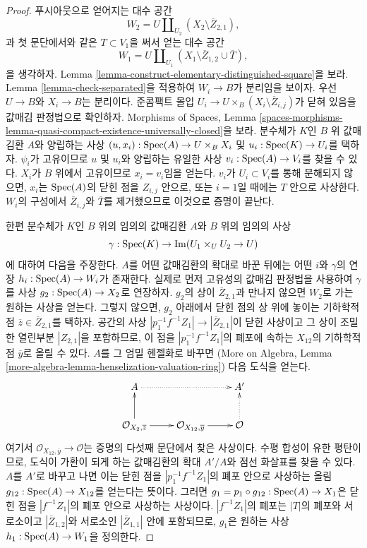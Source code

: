 \begin{proof}
\medskip\noindent
푸시아웃으로 얻어지는 대수 공간
$$
W_2 = U \coprod\nolimits_{U_2} (X_2 \setminus \overline{Z}_{2, 1}),
$$
과 첫 문단에서와 같은 $T \subset V_1$을 써서 얻는 대수 공간
$$
W_1 = U \coprod\nolimits_{U_1}
(X_1 \setminus \overline{Z}_{1, 2} \cup \overline{T}),
$$
을 생각하자. Lemma
\ref{lemma-construct-elementary-distinguished-square}을 보라.
Lemma \ref{lemma-check-separated}을 적용하여 $W_i \to B$가 분리임을
보이자. 우선 $U \to B$와 $X_i \to B$는 분리이다.
준콤팩트 몰입
$U_i \to U \times_B (X_i \setminus \overline{Z}_{i, j})$가 닫혀
있음을 값매김 판정법으로 확인하자. Morphisms of Spaces, Lemma
\ref{spaces-morphisms-lemma-quasi-compact-existence-universally-closed}을
보라. 분수체가 $K$인 $B$ 위 값매김환 $A$와 양립하는 사상
$(u, x_i) : \mathop{\mathrm{Spec}}(A) \to U \times_B X_i$ 및
$u_i : \mathop{\mathrm{Spec}}(K) \to U_i$를 택하자. $\psi_i$가 고유이므로
$u$ 및 $u_i$와 양립하는 유일한 사상
$v_i : \mathop{\mathrm{Spec}}(A) \to V_i$를 찾을 수 있다. $X_i$가 $B$ 위에서
고유이므로 $x_i = v_i$임을 얻는다. $v_i$가 $U_i \subset V_i$를
통해 분해되지 않으면, $x_i$는 $\mathop{\mathrm{Spec}}(A)$의 닫힌 점을
$Z_{i, j}$ 안으로, 또는 $i = 1$일 때에는 $T$ 안으로 사상한다.
$W_i$의 구성에서 $\overline{Z}_{i, j}$와 $\overline{T}$를
제거했으므로 이것으로 증명이 끝난다.

\medskip\noindent
한편 분수체가 $K$인 $B$ 위의 임의의 값매김환 $A$와 $B$ 위의
임의의 사상
$$
\gamma : \mathop{\mathrm{Spec}}(K) \to \mathop{\mathrm{Im}}(U_1 \times_U U_2 \to U)
$$
에 대하여 다음을 주장한다. $A$를 어떤 값매김환의 확대로 바꾼 뒤에는
어떤 $i$와 $\gamma$의 연장
$h_i : \mathop{\mathrm{Spec}}(A) \to W_i$가 존재한다. 실제로 먼저 고유성의 값매김
판정법을 사용하여 $\gamma$를 사상 $g_2 : \mathop{\mathrm{Spec}}(A) \to X_2$로
연장하자. $g_2$의 상이 $\overline{Z}_{2, 1}$과 만나지 않으면
$W_2$로 가는 원하는 사상을 얻는다. 그렇지 않으면, $g_2$ 아래에서
닫힌 점의 상 위에 놓이는 기하학적 점
$\overline{z} \in \overline{Z}_{2, 1}$를 택하자.
공간의 사상
$|p_1^{-1}f^{-1}Z_1| \to |\overline{Z}_{2, 1}|$이 닫힌 사상이고
그 상이 조밀한 열린부분 $|Z_{2, 1}|$을 포함하므로,
이 점을 $|p_1^{-1}f^{-1}Z_1|$의 폐포에 속하는
$X_{12}$의 기하학적 점 $\overline{y}$로 올릴 수 있다.
$A$를 그 엄밀 헨젤화로 바꾸면
(More on Algebra, Lemma
\ref{more-algebra-lemma-henselization-valuation-ring})
다음 도식을 얻는다.
$$
\xymatrix{
A \ar@{..>}[rr] & & A' \\
\mathcal{O}_{X_2, \overline{z}} \ar[r] \ar[u] &
\mathcal{O}_{X_{12}, \overline{y}} \ar[r] &
\mathcal{O} \ar@{..>}[u]
}
$$
여기서 $\mathcal{O}_{X_{12}, \overline{y}} \to \mathcal{O}$는
증명의 다섯째 문단에서 찾은 사상이다.
수평 합성이 유한 평탄이므로, 도식이 가환이 되게 하는 값매김환의
확대 $A'/A$와 점선 화살표를 찾을 수 있다. $A$를 $A'$로 바꾸고
나면 이는 닫힌 점을 $|p_1^{-1}f^{-1}Z_1|$의 폐포 안으로 사상하는
올림 $g_{12} : \mathop{\mathrm{Spec}}(A) \to X_{12}$를 얻는다는 뜻이다.
그러면 $g_1 = p_1 \circ g_{12} : \mathop{\mathrm{Spec}}(A) \to X_1$은 닫힌 점을
$|f^{-1}Z_1|$의 폐포 안으로 사상하는 사상이다.
$|f^{-1}Z_1|$의 폐포는 $|T|$의 폐포와 서로소이고
$|\overline{Z}_{1, 2}|$와 서로소인
$|\overline{Z}_{1, 1}|$ 안에 포함되므로,
$g_1$은 원하는 사상 $h_1 : \mathop{\mathrm{Spec}}(A) \to W_1$을 정의한다.


\end{proof}
